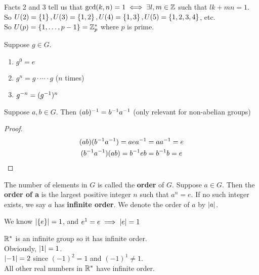 \begin{example}
    Facts 2 and 3 tell us that $\gcd (k,n) = 1 \iff \exists l,m \in \mathbb{Z}$ such that $lk + mn = 1$. \\
    So $U(2) = \left\{1\right\}, U(3) = \left\{1,2\right\}, U(4) = \left\{1, 3\right\}, U(5) = \left\{1,2,3,4\right\}$, etc. \\
    So $U(p) = \left\{1, \dots, p-1\right\} = \mathbb{Z}_p^*$ where $p$ is prime.
\end{example}

\begin{definition}[exponentiation]
    Suppose $g \in G$.
    \begin{enumerate}
        \item $g^0 = e$
        \item $g^n = g \cdot \cdots \cdot g$ ($n$ times)
        \item $g^{-n} = (g ^{-1})^n$
    \end{enumerate}
\end{definition}

\begin{theorem}
    Suppose $a,b \in G$. Then $(ab)^{-1} = b^{-1} a^{-1}$ (only relevant for non-abelian groups)
\end{theorem}
\begin{proof}
    \begin{align*}
        (ab)(b^{-1} a^{-1}) = aea^{-1} &= aa^{-1} = e \\
        (b^{-1} a^{-1})(ab) = b^{-1} e b &= b^{-1} b = e
    \end{align*}
\end{proof}

\begin{definition}
    The number of elements in $G$ is called the \textbf{order} of $G$. Suppose $a \in G$. Then the \textbf{order of a} is the largest positive integer $n$ such that $a^n = e$. If no such integer exists, we say $a$ has \textbf{infinite order}. We denote the order of $a$ by $\left|a\right|$.
\end{definition}

\begin{example}
    We know $\left|\left\{e\right\}\right| = 1$, and $e^1 = e \implies \left|e\right| = 1$
\end{example}

\begin{example}
    $\mathbb{R}^*$ is an infinite group so it has infinite order. \\
    Obviously, $\left|1\right| = 1$. \\
    $\left|-1\right| = 2$ since $(-1)^2 = 1$ and $(-1)^1 \neq 1$. \\ 
    All other real numbers in $\mathbb{R}^*$ have infinite order.
\end{example}

